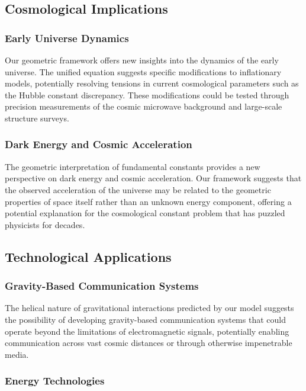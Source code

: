 \documentclass[12pt]{article}
\numberwithin{equation}{section}
\begin{document}
\subsection{Cosmological Implications}

\subsubsection{Early Universe Dynamics}

Our geometric framework offers new insights into the dynamics of the early universe. The unified equation suggests specific modifications to inflationary models, potentially resolving tensions in current cosmological parameters such as the Hubble constant discrepancy. These modifications could be tested through precision measurements of the cosmic microwave background and large-scale structure surveys.

\subsubsection{Dark Energy and Cosmic Acceleration}

The geometric interpretation of fundamental constants provides a new perspective on dark energy and cosmic acceleration. Our framework suggests that the observed acceleration of the universe may be related to the geometric properties of space itself rather than an unknown energy component, offering a potential explanation for the cosmological constant problem that has puzzled physicists for decades.

\subsection{Technological Applications}

\subsubsection{Gravity-Based Communication Systems}

The helical nature of gravitational interactions predicted by our model suggests the possibility of developing gravity-based communication systems that could operate beyond the limitations of electromagnetic signals, potentially enabling communication across vast cosmic distances or through otherwise impenetrable media.

\subsubsection{Energy Technologies}
\end{document}
